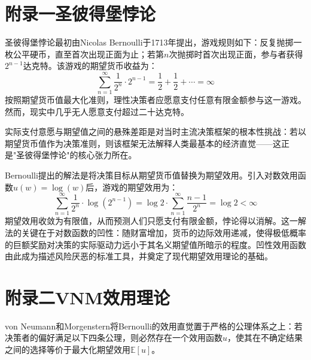 \thispagestyle{appendixheader}
\setcounter{app_fig}{1}
\setcounter{app_tab}{1}
\setcounter{equation}{0}
\renewcommand\theequation{附\arabic{app}-\arabic{equation}}

\setcounter{chapter}{0}
\setcounter{section}{0}
\thispagestyle{appendixheader}
\chapter*{附录一\quad 圣彼得堡悖论}\label{chap:app1}
圣彼得堡悖论最初由Nicolas Bernoulli于1713年提出，游戏规则如下：反复抛掷一枚公平硬币，直至首次出现正面为止；若第$n$次抛掷时首次出现正面，参与者获得$2^{n-1}$达克特。该游戏的期望货币收益为：
\begin{equation}
    \sum_{n=1}^{\infty} \frac{1}{2^n} \cdot 2^{n-1} = \frac{1}{2} + \frac{1}{2} + \cdots = \infty
\end{equation}
按照期望货币值最大化准则，理性决策者应愿意支付任意有限金额参与这一游戏。然而，现实中几乎无人愿意支付超过二十达克特。

实际支付意愿与期望值之间的悬殊差距是对当时主流决策框架的根本性挑战：若以期望货币值作为决策准则，则该框架无法解释人类最基本的经济直觉——这正是"圣彼得堡悖论"的核心张力所在。

Bernoulli提出的解法\citep{bernoulli1954exposition}是将决策目标从期望货币值替换为期望效用。引入对数效用函数$u(w) = \log(w)$后，游戏的期望效用为：
\begin{equation}
    \sum_{n=1}^{\infty} \frac{1}{2^n} \cdot \log(2^{n-1}) = \log 2 \cdot \sum_{n=1}^{\infty} \frac{n-1}{2^n} = \log 2 < \infty
\end{equation}
期望效用收敛为有限值，从而预测人们只愿支付有限金额，悖论得以消解。这一解法的关键在于对数函数的凹性：随财富增加，货币的边际效用递减，使得极低概率的巨额奖励对决策的实际驱动力远小于其名义期望值所暗示的程度。凹性效用函数由此成为描述风险厌恶的标准工具，并奠定了现代期望效用理论的基础。

\chapter*{附录二\quad VNM效用理论}\label{chap:app2}

von Neumann和Morgenstern\citep{vonneumann1953theory}将Bernoulli的效用直觉置于严格的公理体系之上：若决策者的偏好满足以下四条公理，则必然存在一个效用函数$u$，使其在不确定结果之间的选择等价于最大化期望效用$\mathbb{E}[u]$。

